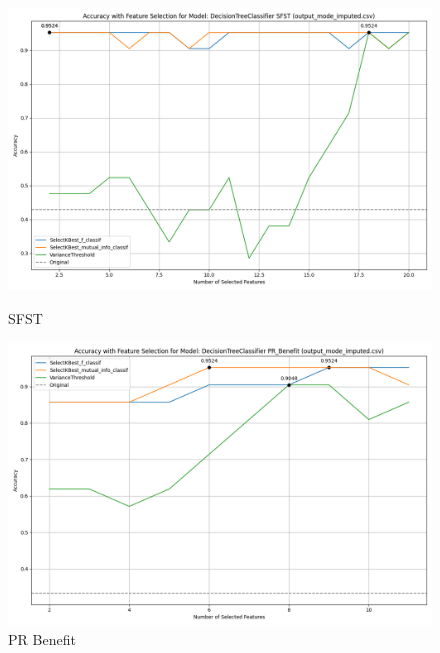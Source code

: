 \begin{figure}[H]
    \centering
    \begin{minipage}[b]{0.45\textwidth}
        \includegraphics[width=\textwidth]{class_specific_section/images_class_ensemble_reduction/feature_selection_accuracy_plot_output_mode_imputedcsv_DecisionTreeClassifier_SFST.png}
        \caption{SFST}
        \label{fig_class_spec:sfst_featred_graph}
    \end{minipage}
    \hfill
    \begin{minipage}[b]{0.45\textwidth}
        \includegraphics[width=\textwidth]{class_specific_section/images_class_ensemble_reduction/feature_selection_accuracy_plot_output_mode_imputedcsv_DecisionTreeClassifier_PR_Benefit.png}
        \caption{PR Benefit}
        \label{fig_class_spec:pr_ben_featred_graph}
    \end{minipage}
\end{figure}

